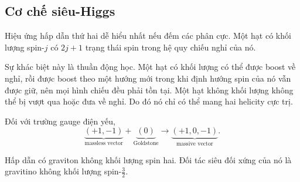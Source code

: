 \subsection{Cơ chế siêu-Higgs}

Hiệu ứng hấp dẫn thứ hai dễ hiểu nhất nếu đếm các phân cực. Một hạt có khối lượng spin-\(j\) có \(2j+1\) trạng thái spin trong hệ quy chiếu nghỉ của nó.

\begin{classroomqa}
\end{classroomqa}

Sự khác biệt này là thuần động học. Một hạt có khối lượng có thể được boost về nghỉ, rồi được boost theo một hướng mới trong khi định hướng spin của nó vẫn được giữ, nên mọi hình chiếu đều phải tồn tại. Một hạt không khối lượng không thể bị vượt qua hoặc đưa về nghỉ. Do đó nó chỉ có thể mang hai helicity cực trị.

Đối với trường gauge điện yếu,
\begin{equation}
\underbrace{(+1,-1)}_{\text{massless vector}}
+
\underbrace{(0)}_{\text{Goldstone}}
\longrightarrow
\underbrace{(+1,0,-1)}_{\text{massive vector}}.
\label{eq:l9-higgs-count}
\end{equation}

\begin{classroomqa}
\end{classroomqa}

Hấp dẫn có graviton không khối lượng spin hai. Đối tác siêu đối xứng của nó là gravitino không khối lượng spin-\(\tfrac32\).

\begin{classroomqa}
\end{classroomqa}

